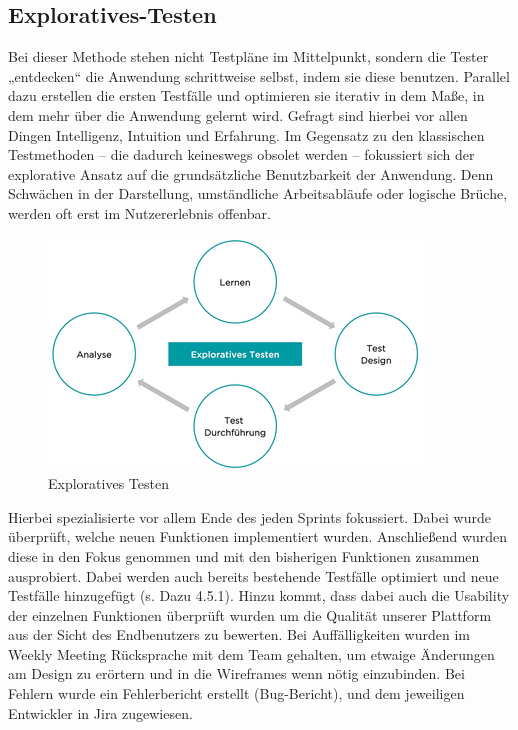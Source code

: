 \subsection{Exploratives-Testen}
\label{sub:UmsetzungTestExplorativ}

Bei dieser Methode stehen nicht Testpläne im Mittelpunkt, sondern die Tester „entdecken“ die Anwendung schrittweise selbst, indem sie diese benutzen. Parallel dazu erstellen die ersten Testfälle und optimieren sie iterativ in dem Maße, in dem mehr über die Anwendung gelernt wird. Gefragt sind hierbei vor allen Dingen Intelligenz, Intuition und Erfahrung. Im Gegensatz zu den klassischen Testmethoden – die dadurch keineswegs obsolet werden – fokussiert sich der explorative Ansatz auf die grundsätzliche Benutzbarkeit der Anwendung. Denn Schwächen in der Darstellung, umständliche Arbeitsabläufe oder logische Brüche, werden oft erst im Nutzererlebnis offenbar.

\begin{figure}[!htb]
    \centering
    \includegraphics[width=.8\textwidth]{figures/rebecca/Exploratives_Testen.png}
    \caption[]{Exploratives Testen}
    \label{fig:explorativesTesten}
\end{figure}

Hierbei spezialisierte vor allem Ende des jeden Sprints fokussiert. Dabei wurde überprüft, welche neuen Funktionen implementiert wurden. Anschließend wurden diese in den Fokus genommen und mit den bisherigen Funktionen zusammen ausprobiert. Dabei werden auch bereits bestehende Testfälle optimiert und neue Testfälle hinzugefügt (s. Dazu 4.5.1). Hinzu kommt, dass dabei auch die Usability der einzelnen Funktionen überprüft wurden um die Qualität unserer Plattform aus der Sicht des Endbenutzers zu bewerten.
Bei Auffälligkeiten wurden im Weekly Meeting Rücksprache mit dem Team gehalten, um etwaige Änderungen am Design zu erörtern und in die Wireframes wenn nötig einzubinden.
Bei Fehlern wurde ein Fehlerbericht erstellt (Bug-Bericht), und dem jeweiligen Entwickler in Jira zugewiesen.